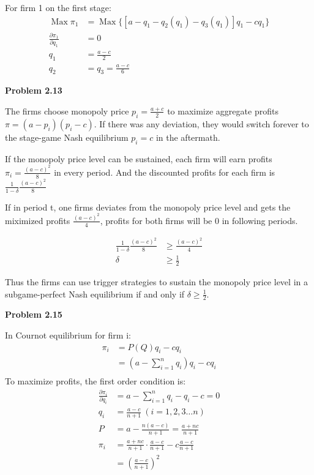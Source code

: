 \documentclass{article}
\begin{document}
{{{{{    For firm 1 on the first stage:
    \begin{align*}
        \mathop{Max} \pi_1&=\mathop{Max} \{[a-q_1-q_2(q_1)-q_3(q_1)]q_1-cq_1\}\\
        \frac{\partial \pi_1}{\partial q_1}&=0\\
        q_1&=\frac{a-c}{2}\\
        q_2&=q_3=\frac{a-c}{6}
    \end{align*}

    \noindent\Large{\textbf{{Problem 2.13}}

    The firms choose monopoly price $p_i=\frac{a+c}{2}$ to maximize aggregate profits $\pi = (a-p_i)(p_i-c)$. If there was any deviation, they would switch forever to the stage-game Nash equilibrium $p_i=c$ in the aftermath.

    If the monopoly price level can be sustained, each firm will earn profits $\pi_i=\frac{(a-c)^2}{8}$ in every period. And the discounted profits for each firm is $\frac{1}{1-\delta} \frac{(a-c)^2}{8}$ 
    
    If in period t, one firms deviates from the monopoly price level and gets the miximized profits $\frac{(a-c)^2}{4}$, profits for both firms will be 0 in following periods.

    \begin{align*}
        \frac{1}{1-\delta} \frac{(a-c)^2}{8}& \geqslant \frac{(a-c)^2}{4}\\
        \delta & \geqslant \frac{1}{2}
    \end{align*}

    Thus the firms can use trigger strategies to sustain the monopoly price level in a subgame-perfect Nash equilibrium if and only if $\delta \geqslant \frac{1}{2}$.

    \noindent\Large{\textbf{{Problem 2.15}}

    In Cournot equilibrium for firm i:
    \begin{align*}
        \pi_i&=P(Q)q_i-cq_i\\
        &=(a-\sum_{i=1}^n q_i)q_i-cq_i\\
    \end{align*}
    To maximize profits, the first order condition is:
    \begin{align*}
        \frac{\partial \pi_i}{\partial q_i}&=a-\sum_{i=1}^n q_i-q_i-c=0\\
        q_i&=\frac{a-c}{n+1} \ (i=1,2,3 \dots n)\\
        P&=a-\frac{n(a-c)}{n+1}=\frac{a+nc}{n+1}\\
        \pi_i&=\frac{a+nc}{n+1} \cdot \frac{a-c}{n+1}-c \frac{a-c}{n+1}\\
        &=(\frac{a-c}{n+1})^2
    \end{align*}

}}}}}}}
\end{document}
